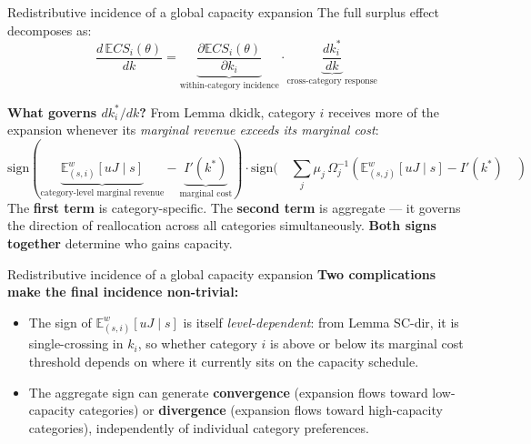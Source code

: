 \documentclass[10pt, aspectratio=169]{beamer}
\newcommand{\E}{\mathbb{E}}
\newcommand{\sign}{\mathrm{sign}}
\begin{document}
\begin{frame}{Redistributive incidence of a global capacity expansion}
The full surplus effect decomposes as:
\[ \frac{d\,\E CS_i(\theta)}{dk} = \underbrace{\frac{\partial \E CS_i(\theta)}{\partial k_i}}_{\text{within-category incidence}} \cdot \underbrace{\frac{dk_i^\ast}{dk}}_{\text{cross-category response}} \]

\textbf{What governs $dk_i^\ast/dk$?} From Lemma dkidk, category $i$ receives more of the expansion whenever its \emph{marginal revenue exceeds its marginal cost}:
\[ \sign\!(\underbrace{\E_{(s,i)}^w[uJ \mid s]}_{\text{category-level marginal revenue}} - \underbrace{I'(k^\ast)}_{\text{marginal cost}}) \cdot \sign\! (\quad \sum_j \mu_j\,\Omega_j^{-1}\!(\E_{(s,j)}^w[uJ \mid s] - I'(k^\ast) \quad ) \]
The \textbf{first term} is category-specific. The \textbf{second term} is aggregate — it governs the direction of reallocation across all categories simultaneously. \textbf{Both signs together} determine who gains capacity.
\end{frame}


\begin{frame}{Redistributive incidence of a global capacity expansion}
\textbf{Two complications make the final incidence non-trivial:}
\begin{itemize}
\item The sign of $\E_{(s,i)}^w[uJ\mid s]$ is itself \emph{level-dependent}: from Lemma SC-dir, it is single-crossing in $k_i$, so whether category $i$ is above or below its marginal cost threshold depends on where it currently sits on the capacity schedule.
\item The aggregate sign can generate \textbf{convergence} (expansion flows toward low-capacity categories) or \textbf{divergence} (expansion flows toward high-capacity categories), independently of individual category preferences.
\end{itemize}
\end{frame}

\end{document}
